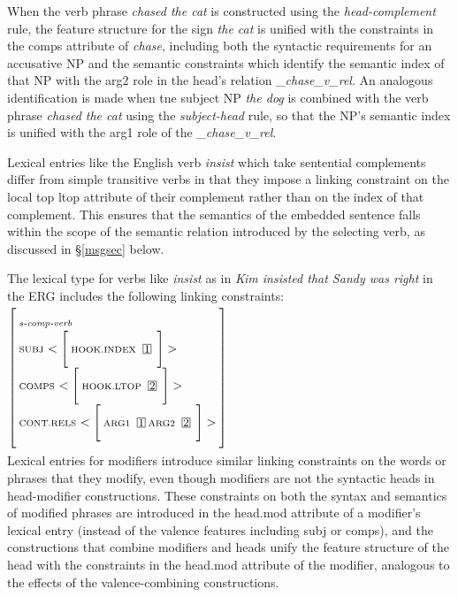 \documentclass[12pt]{article}
\newcommand{\avmplus}[1]{{\setlength{\arraycolsep}{0.8mm}	
                       \renewcommand{\arraystretch}{1.1} %
                       \left[ 			
                       \begin{array}{l}
                       \\[-2mm] #1 \\[-2mm] \\
                       \end{array} 		
                       \right]
                    }}
\newcommand{\att}[1]{{\mbox{\scriptsize {\bf #1}}}}
\newcommand{\attval}[2]{{\mbox{\scriptsize #1}\ {{#2}}}}
\newcommand{\attvallist}[2]{{\mbox{\scriptsize #1}\ {<{#2}>}}}
\newcommand{\ind}[1]{{\setlength{\fboxsep}{0.25mm} \: \fbox{{\small #1}} \:}}
\begin{document}
When the verb phrase {\it chased the cat} is constructed using the
{\it head-complement} rule, the feature structure for the sign {\it the cat}
is unified with the constraints in the {\sc comps} attribute of {\it chase},
including both the syntactic requirements for an accusative NP and the
semantic constraints which identify the semantic index of that NP with the
{\sc arg2} role in the head's relation {\it \_chase\_v\_rel}.  An analogous
identification is made when tne subject NP {\it the dog} is combined with
the verb phrase {\it chased the cat} using the {\it subject-head} rule, so
that the NP's semantic index is unified with the {\sc arg1} role of the
{\it \_chase\_v\_rel}.

Lexical entries like the English verb {\it insist} which take sentential
complements differ from simple transitive verbs in that they impose a 
linking constraint on the local top {\sc ltop} attribute of their complement 
rather than on the {\sc index} of that complement.  This ensures that the
semantics of the embedded sentence falls within the scope of the semantic
relation introduced by the selecting verb, as discussed in \S\ref{msgsec} 
below.

The lexical type for verbs like {\it insist} as in {\it Kim insisted that
Sandy was right} in the ERG includes the following linking constraints:\\

$\avmplus{\att{\it s-comp-verb}\\
          \attvallist{SUBJ}{
          \avmplus{\attval{HOOK.INDEX}{\ind{1}}}}\\
          \attvallist{COMPS}{
          \avmplus{\attval{HOOK.LTOP}{\ind{2}}}}\\
          \attvallist{CONT.RELS}{
          \avmplus{\attval{ARG1}{\ind{1}}
                   \attval{ARG2}{\ind{2}}}}}$\\

Lexical entries for modifiers introduce similar linking constraints
on the words or phrases that they modify, even though modifiers are not the
syntactic heads in head-modifier constructions.  These constraints on both
the syntax and semantics of modified phrases are introduced in the 
{\sc head.mod} attribute of a modifier's lexical entry (instead of the
valence features including {\sc subj} or {\sc comps}), and the constructions
that combine modifiers and heads unify the feature structure of the head
with the constraints in the {\sc head.mod} attribute of the modifier, analogous
to the effects of the valence-combining constructions.
\end{document}
